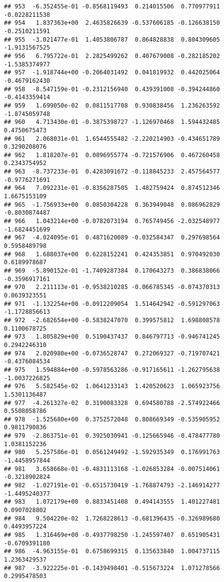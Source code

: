 \documentclass[
]{article}
\begin{document}
\begin{verbatim}
## 953  -6.352455e-01 -0.8568119493  0.214015506  0.770977911 -0.0228211538
## 954   1.837363e+00  2.4635826639 -0.537606185 -0.126638150 -0.2510211591
## 955  -3.021477e-01  1.4053806787  0.864828838  0.804309605 -1.9131567525
## 956   6.795722e-01  2.2825499262  0.407679008 -0.282185202 -1.5385374977
## 957  -1.918744e+00 -0.2064031492  0.041819932  0.442025064 -0.4679162430
## 958  -8.547159e-01 -0.2312156940  0.439391008 -0.394244860 -0.4143359414
## 959   1.699050e-02  0.0811517708  0.930838456  1.236263592 -1.8745059748
## 960   4.713430e-01 -0.3875398727 -1.126970468  1.594432485  0.4750675473
## 961   2.068031e-01  1.6544555482 -2.220214903 -0.434651789  0.3290208076
## 962   1.818207e-01  0.0896955774 -0.721576906  0.467260458  0.2343754952
## 963  -8.737233e-01  0.4283091672 -0.118845233  2.457564577 -0.9776271691
## 964   7.092231e-01 -0.8356287505  1.482759424  0.874512346  1.6675153109
## 965  -1.756933e+00  0.0850304228  0.363949048  0.086962829 -0.8030874487
## 966   1.043214e+00 -0.0782073194  0.765749456 -2.032548977 -1.6824451699
## 967  -4.024095e-01  0.4871620089 -0.032584347  0.297698564  0.5958489798
## 968   1.688037e+00  0.6228152241  0.424353851  0.970492030  0.6189978687
## 969  -5.890152e-01 -1.7409287384  0.170643273  0.386838066 -0.3596917161
## 970   2.211113e-01 -0.9538210285 -0.066785345 -0.074370313  0.0639323551
## 971  -1.132254e+00 -0.0912209054  1.514642942 -0.591297063 -1.1728856613
## 972  -2.682654e+00 -0.5838247070  0.399575812  1.698808578  0.1100678725
## 973   1.805829e+00  0.5190437437  0.846797713 -0.946741245  0.2942246310
## 974   2.020980e+00 -0.0736528747  0.272069327 -0.719707421 -0.4376084534
## 975   1.594884e+00 -0.5978563286 -0.917165611 -1.262795638 -1.0037226825
## 976   5.582545e-02  1.0641233143  1.420520623  1.065923756  1.5301136487
## 977  -4.261327e-02  0.3190083328  0.694580788 -2.574922466  0.5508058786
## 978  -1.525680e+00  0.3752572048  0.808669349 -0.535905952  0.9811790836
## 979  -2.863751e-01  0.3925030941 -0.125665946 -0.478477780  1.0381152236
## 980   5.257586e-01  0.0561249492 -1.592935349  0.176991763 -1.4458957844
## 981   3.658668e-01 -0.4831113168 -1.026853284 -0.007514061 -0.3218902824
## 982  -1.027191e-01 -0.6515730419 -1.768874793 -2.146914277 -1.4495240377
## 983   1.072179e+00  0.8833451408  0.494143555  1.401227481  0.0907028802
## 984   9.504220e-02  1.7268228613 -0.681396435 -0.326989680  0.4493957224
## 985   1.316469e+00 -0.4937798250 -1.245597407  0.651905431 -0.6709391180
## 986  -4.963155e-01  0.6758699315  0.135633840  1.004737115  1.2363429537
## 987  -3.922225e-01 -0.1439498401 -0.515673224  1.071278566  0.2995478503

\end{verbatim}
\end{document}

